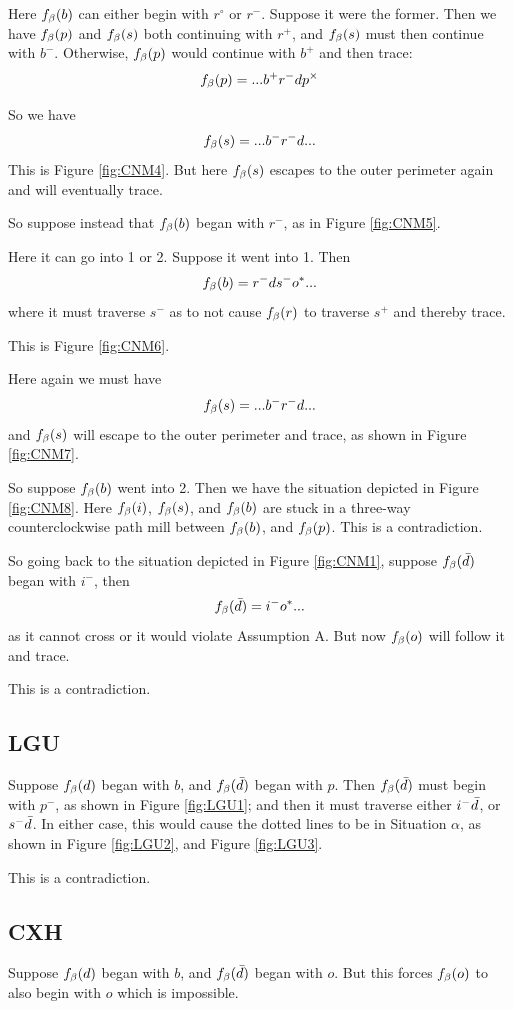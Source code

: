 Here $f_\beta(b)$ can either begin with $r^\circ$ or $r^-$. Suppose it were the former. Then we have $f_\beta(p)$ and $f_\beta(s)$ both continuing with $r^+$, and $f_\beta(s)$ must then continue with $b^-$. Otherwise, $f_\beta(p)$ would continue with $b^+$ and then trace:
\[
f_\beta(p) = ...b^+ r^- d p^\times
\]

So we have
\[
f_\beta(s) = ...b^- r^- d...
\]
This is Figure \ref{fig:CNM4}. But here $f_\beta(s)$ escapes to the outer perimeter again and will eventually trace.

So suppose instead that $f_\beta(b)$ began with $r^-$, as in Figure \ref{fig:CNM5}.

Here it can go into 1 or 2. Suppose it went into 1. Then
\[
f_\beta(b) = r^- d s^- o^*...
\]
where it must traverse $s^-$ as to not cause $f_\beta(r)$ to traverse $s^+$ and thereby trace.

This is Figure \ref{fig:CNM6}.

Here again we must have
\[
f_\beta(s) = ...b^- r^- d...
\]
and $f_\beta(s)$ will escape to the outer perimeter and trace, as shown in Figure \ref{fig:CNM7}.

So suppose $f_\beta(b)$ went into 2. Then we have the situation depicted in Figure \ref{fig:CNM8}. Here $f_\beta(i)$, $f_\beta(s)$, and $f_\beta(b)$ are stuck in a three-way counterclockwise path mill between $f_\beta(b)$, and $f_\beta(p)$. This is a contradiction.

So going back to the situation depicted in Figure \ref{fig:CNM1}, suppose $f_\beta(\bar{d})$ began with $i^-$, then
\[
f_\beta(\bar{d}) = i^- o^*...
\]
as it cannot cross or it would violate Assumption A. But now $f_\beta(o)$ will follow it and trace.

This is a contradiction.

\subsection{LGU}\label{LGU}
Suppose $f_\beta(d)$ began with $b$, and $f_\beta(\bar{d})$ began with $p$. Then $f_\beta(\bar{d})$ must begin with $p^-$, as shown in Figure \ref{fig:LGU1}; and then it must traverse either $i^- \bar{d}$, or $s^- \bar{d}$. In either case, this would cause the dotted lines to be in Situation $\alpha$, as shown in Figure \ref{fig:LGU2}, and Figure \ref{fig:LGU3}.

This is a contradiction.

\subsection{CXH}
Suppose $f_\beta(d)$ began with $b$, and $f_\beta(\bar{d})$ began with $o$. But this forces $f_\beta(o)$ to also begin with $o$ which is impossible.


